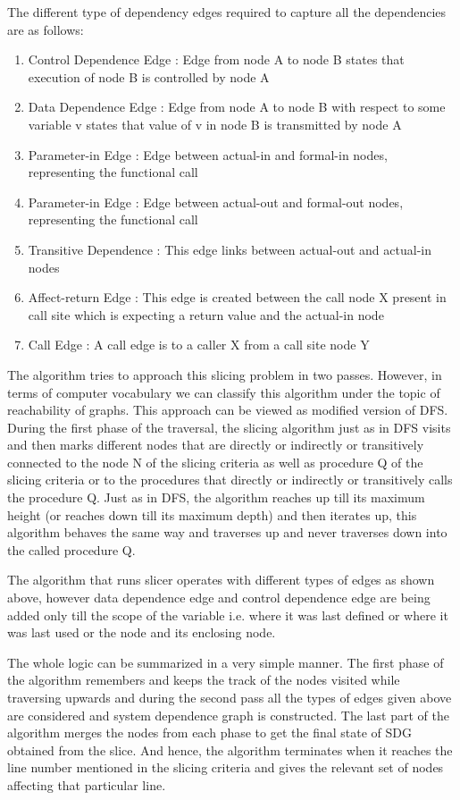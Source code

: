 \documentclass[conference]{IEEEtran}
\begin{document}
The different type of dependency edges required to capture all the dependencies are as follows:
\begin{enumerate}
    \item Control Dependence Edge : Edge from node A to node B states that execution of node B is controlled by node A
    \item Data Dependence Edge : Edge from node A to node B with respect to some variable v states that value of v in node B is transmitted by node A
    \item Parameter-in Edge : Edge between actual-in and formal-in nodes, representing the functional call
    \item Parameter-in Edge : Edge between actual-out and formal-out nodes, representing the functional call
    \item Transitive Dependence : This edge links between actual-out and actual-in nodes
    \item Affect-return Edge : This edge is created between the call node X present in call site which is expecting a return value and the actual-in node
    \item Call Edge : A call edge is to a caller X from a call site node Y
\end{enumerate}
The algorithm tries to approach this slicing problem in two passes. However, 
in terms of computer vocabulary we can classify this algorithm under the topic of reachability of graphs. This approach can be viewed as modified version of DFS. During the first phase of the traversal, the slicing algorithm just as in DFS visits and then marks different nodes that are directly or indirectly or transitively connected to the node N of the slicing criteria as well as procedure Q of the slicing criteria or to the procedures that directly or indirectly or transitively calls the procedure Q. Just as in DFS, the algorithm reaches up till its maximum height (or reaches down till its maximum depth) and then iterates up, this algorithm behaves the same way and traverses up and never traverses down into the called procedure Q.

The algorithm that runs slicer operates with different types of edges as shown
above, however data dependence edge and control dependence edge are being
added only till the scope of the variable i.e. where it was last defined or where it was last used or the node and its enclosing node.

The whole logic can be summarized in a very simple manner. The first phase of the algorithm remembers and keeps the track of the nodes visited while traversing upwards and during the second pass all the types
of edges given above are considered and system dependence graph is constructed. The last part of the algorithm merges the nodes from each phase to get the final state of SDG obtained from the slice. And hence, the algorithm terminates when it reaches the line number mentioned in the slicing criteria and gives the relevant set of nodes affecting that particular line.
\end{document}

